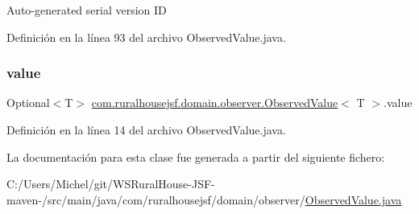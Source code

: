 Auto-\/generated serial version ID 

Definición en la línea 93 del archivo Observed\+Value.\+java.

\mbox{\label{classcom_1_1ruralhousejsf_1_1domain_1_1observer_1_1_observed_value_a7f337dfd21158b7642243b5fd1fcb877}} 
\subsubsection{\texorpdfstring{value}{value}}
{\footnotesize\ttfamily Optional$<$T$>$ \mbox{\hyperlink{classcom_1_1ruralhousejsf_1_1domain_1_1observer_1_1_observed_value}{com.\+ruralhousejsf.\+domain.\+observer.\+Observed\+Value}}$<$ T $>$.value\hspace{0.3cm}{\ttfamily [private]}}



Definición en la línea 14 del archivo Observed\+Value.\+java.



La documentación para esta clase fue generada a partir del siguiente fichero\+:\begin{DoxyCompactItemize}
\item 
C\+:/\+Users/\+Michel/git/\+W\+S\+Rural\+House-\/\+J\+S\+F-\/maven-\//src/main/java/com/ruralhousejsf/domain/observer/\mbox{\hyperlink{_observed_value_8java}{Observed\+Value.\+java}}\end{DoxyCompactItemize}
